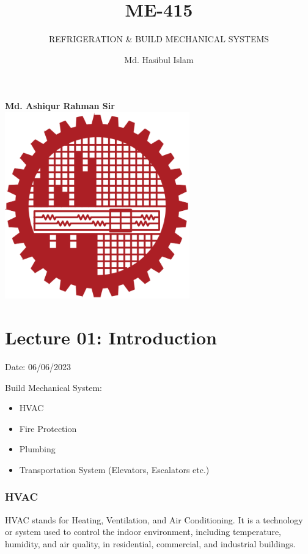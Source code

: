 \documentclass{article}
\title{ME-415}
\author{Md. Hasibul Islam}
\subtitle{REFRIGERATION \& BUILD MECHANICAL SYSTEMS}
\begin{document}
\begin{titlepage}
    \centering
    
    {\Huge\bfseries\maketitle}
    \textbf{Md. Ashiqur Rahman Sir} \\
    \vspace{2cm}
    \includegraphics[width=8cm]{institution_logo.jpg}
    \vfill
    \vspace*{2cm}
\end{titlepage}

\tableofcontents
\pagebreak
\section{Lecture 01: Introduction} 
\hfill Date: 06/06/2023

Build Mechanical System:
\begin{itemize}
  \item HVAC
  \item Fire Protection
  \item Plumbing
  \item Transportation System (Elevators, Escalators etc.)
\end{itemize}

\subsubsection*{HVAC}
HVAC stands for Heating, Ventilation, and Air Conditioning. It is a technology or system used to control the indoor environment, including temperature, humidity, and air quality, in residential, commercial, and industrial buildings.
\end{document}
